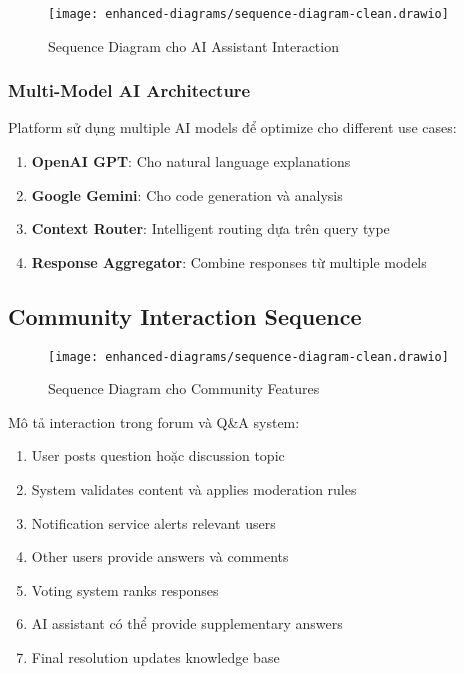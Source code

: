 \begin{figure}[H]
\centering
\texttt{[image: enhanced-diagrams/sequence-diagram-clean.drawio]}
\caption{Sequence Diagram cho AI Assistant Interaction}
\label{fig:sequence-ai}
\end{figure}

\subsubsection{Multi-Model AI Architecture}

Platform sử dụng multiple AI models để optimize cho different use cases:

\begin{enumerate}
    \item \textbf{OpenAI GPT}: Cho natural language explanations
    \item \textbf{Google Gemini}: Cho code generation và analysis
    \item \textbf{Context Router}: Intelligent routing dựa trên query type
    \item \textbf{Response Aggregator}: Combine responses từ multiple models
\end{enumerate}

\subsection{Community Interaction Sequence}
\label{subsec:community-sequence}

\begin{figure}[H]
\centering
\texttt{[image: enhanced-diagrams/sequence-diagram-clean.drawio]}
\caption{Sequence Diagram cho Community Features}
\label{fig:sequence-community}
\end{figure}

Mô tả interaction trong forum và Q\&A system:

\begin{enumerate}
    \item User posts question hoặc discussion topic
    \item System validates content và applies moderation rules
    \item Notification service alerts relevant users
    \item Other users provide answers và comments
    \item Voting system ranks responses
    \item AI assistant có thể provide supplementary answers
    \item Final resolution updates knowledge base
\end{enumerate}
